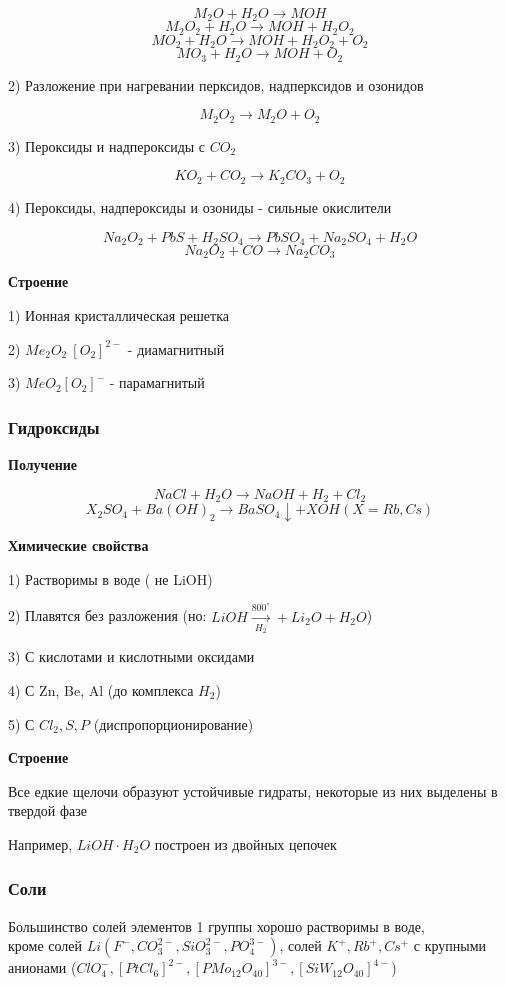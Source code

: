 \documentclass[14pt,a4paper]{scrartcl}
\begin{document}
$$M_2O + H_2O \rightarrow MOH$$
$$M_2O_2 + H_2O \rightarrow MOH + H_2O_2$$
$$MO_2 + H_2O \rightarrow MOH + H_2O_2 + O_2$$
$$MO_3 + H_2O \rightarrow MOH + O_2$$

2) Разложение при нагревании перксидов, надперксидов и озонидов

$$M_2O_2 \rightarrow M_2O + O_2$$

3) Пероксиды и надпероксиды с $CO_2$

$$KO_2  + CO_2 \rightarrow K_2CO_3 + O_2$$

4) Пероксиды, надпероксиды и озониды - сильные окислители

$$Na_2O_2 + PbS + H_2SO_4 \rightarrow PbSO_4 + Na_2SO_4 + H_2O$$
$$Na_2O_2 + CO \rightarrow Na_2CO_3$$

\textbf{Строение}

1) Ионная кристаллическая решетка

2) $Me_2O_2 \ [O_2]^{2-}$ - диамагнитный

3) $MeO_2 [O_2]^- $ - парамагнитый

\subsubsection{Гидроксиды}

\textbf{Получение}

$$NaCl + H_2O \rightarrow NaOH + H_2 + Cl_2$$
$$X_2SO_4 + Ba(OH)_2 \rightarrow BaSO_4 \downarrow + XOH (X=Rb,Cs)$$

\textbf{Химические свойства}

1) Растворимы в воде ( не  LiOH)

2) Плавятся без разложения
(но: $LiOH \xrightarrow[H_2]{800^{\circ}} + Li_2O + H_2O$)

3) С кислотами и кислотными оксидами

4) С Zn, Be, Al (до комплекса $H_2$)

5) С $Cl_2, S, P$ (диспропорционирование)

\textbf{Строение}

Все едкие щелочи образуют устойчивые гидраты, некоторые из них выделены в твердой фазе

Например, $LiOH\cdot H_2O$ построен из двойных цепочек

\subsubsection{Соли}

Большинство солей элементов 1 группы хорошо растворимы в воде,\\
кроме солей $Li (F^-, CO_3^{2-}, SiO_3^{2-}, PO_4^{3-})$, солей $K^+, Rb^+, Cs^+$ с крупными анионами ($ClO_4^-, [PtCl_6]^{2-}, [PMo_{12}O_{40}]^{3-}, [SiW_{12}O_{40}]^{4-}$)
\end{document}
